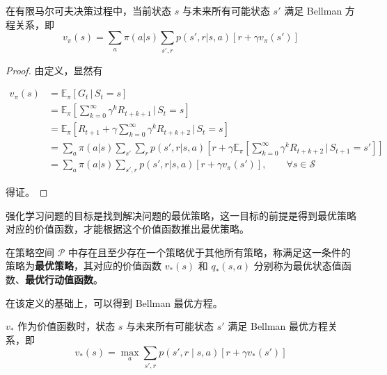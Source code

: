 \begin{Theorem}
    在有限马尔可夫决策过程中，当前状态 $s$ 与未来所有可能状态 $s'$ 满足 Bellman 方程关系，即
    \begin{equation}
        v_{\pi}(s) = \sum_a\pi(a|s)\sum_{s',r}p(s',r|s,a)\left[r+\gamma v_\pi(s') \right]
    \end{equation}
\end{Theorem}

\begin{proof}
    由定义，显然有

    \[
    \begin{aligned} v_\pi(s) & = \mathbb{E}_\pi[G_t\,|\,S_t=s] \\ &=\mathbb{E}_\pi \left[\sum_{k=0}^\infty\gamma^kR_{t+k+1}\,|\,S_t=s \right] \\ &= \mathbb{E}_\pi \left [R_{t+1}+\gamma\sum_{k=0}^\infty\gamma^kR_{t+k+2}\,|\,S_t=s \right] \\ &=\sum_a\pi(a|s)\sum_{s'}\sum_rp(s',r|s,a)\left[r+\gamma \mathbb{E}_\pi \left[\sum_{k=0}^\infty\gamma^kR_{t+k+2}\,|\,S_{t+1}=s' \right] \right] \\ &= \sum_a\pi(a|s)\sum_{s',r}p(s',r|s,a)\left[r+\gamma v_\pi(s') \right], \qquad \forall s \in \mathcal S \end{aligned}
    \]

    得证。
\end{proof}

强化学习问题的目标是找到解决问题的最优策略，这一目标的前提是得到最优策略对应的价值函数，才能根据这个价值函数推出最优策略。

\begin{Definition}
    在策略空间 $\mathcal{P}$ 中存在且至少存在一个策略优于其他所有策略，称满足这一条件的策略为\textbf{最优策略}，其对应的价值函数 $v_*(s)$ 和 $q_*(s,a)$ 分别称为{最优状态值函数}、\textbf{最优行动值函数}。
\end{Definition}

在该定义的基础上，可以得到 Bellman 最优方程\cite{howard1960dynamic}。

\begin{Theorem}
    $v_*$ 作为价值函数时，状态 $s$ 与未来所有可能状态 $s'$ 满足 Bellman 最优方程关系，即
    \begin{equation}
        v_*(s)=\max_{a}\sum_{s',r}p(s',r \mid s,a)[r+\gamma v_*(s')]
    \end{equation}
\end{Theorem}

